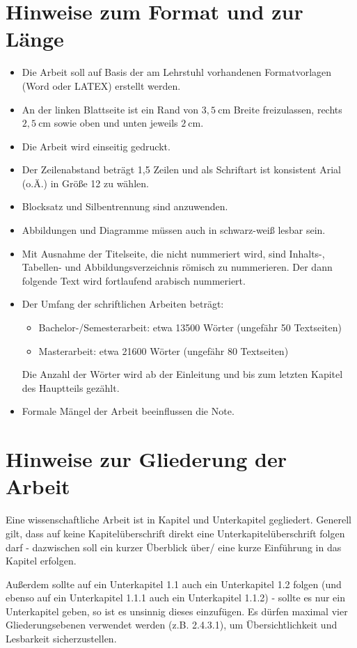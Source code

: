 \documentclass[utf8, a4paper, 11pt, parskip, pointlessnumbers]{scrreprt}
\begin{document}
\section{Hinweise zum Format und zur Länge} 
\begin{itemize}
\item Die Arbeit soll auf Basis der am Lehrstuhl vorhandenen Formatvorlagen (Word oder LATEX) erstellt werden.
\item An der linken Blattseite ist ein Rand von $3,5~\si{\centi\metre}$ Breite freizulassen, rechts $2,5~\si{\centi\metre}$ sowie oben und unten jeweils $2~\si{\centi\metre}$. 
\item Die Arbeit wird einseitig gedruckt.
\item Der Zeilenabstand beträgt 1,5 Zeilen und als Schriftart ist konsistent Arial (o.Ä.) in Größe 12 zu wählen. 
\item Blocksatz und Silbentrennung sind anzuwenden.
\item Abbildungen und Diagramme müssen auch in schwarz-weiß lesbar sein.
\item	Mit Ausnahme der Titelseite, die nicht nummeriert wird, sind Inhalts-, Tabellen- und Abbildungsverzeichnis römisch zu nummerieren. Der dann folgende Text wird fortlaufend arabisch nummeriert. 
\item	Der Umfang der schriftlichen Arbeiten beträgt:
\begin{itemize}
\item Bachelor-/Semesterarbeit: etwa 13500 Wörter (ungefähr 50 Textseiten)
\item Masterarbeit: etwa 21600 Wörter (ungefähr 80 Textseiten)
\end{itemize}
Die Anzahl der Wörter wird ab der Einleitung und bis zum letzten Kapitel des Hauptteils gezählt. 
\item Formale Mängel der Arbeit beeinflussen die Note.
\end{itemize}

\section{Hinweise zur Gliederung der Arbeit}
Eine wissenschaftliche Arbeit ist in Kapitel und Unterkapitel gegliedert. Generell gilt, dass auf keine Kapitelüberschrift direkt eine Unterkapitelüberschrift folgen darf - dazwischen soll ein kurzer Überblick über/ eine kurze Einführung in das Kapitel erfolgen.

Außerdem sollte auf ein Unterkapitel 1.1 auch ein Unterkapitel 1.2 folgen (und ebenso auf ein Unterkapitel 1.1.1 auch ein Unterkapitel 1.1.2) - sollte es nur ein Unterkapitel geben, so ist es unsinnig dieses einzufügen. Es dürfen maximal vier Gliederungsebenen verwendet werden (z.B. 2.4.3.1), um Übersichtlichkeit und Lesbarkeit sicherzustellen.
\end{document}
